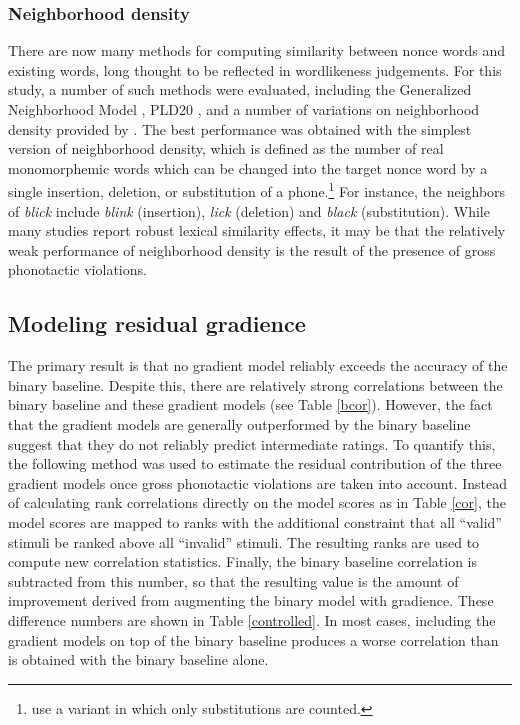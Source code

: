 \subsubsection{Neighborhood density} \label{density}

There are now many methods for computing similarity between nonce words and existing words, long thought to be reflected in wordlikeness judgements. 
For this study, a number of such methods were evaluated, including the Generalized Neighborhood Model \citep{Bailey2001}, PLD20 \citep{Suarez2011}, and a number of variations on neighborhood density \citep{Coltheart1977} provided by \citet{Vaden2009}. The best performance was obtained with the simplest version of neighborhood density, which is defined as the number of real monomorphemic words which can be changed into the target nonce word by a single insertion, deletion, or substitution of a phone.\footnote{\citet{Greenberg1964} use a variant in which only substitutions are counted.} For instance, the neighbors of \emph{blick} include \emph{blink} (insertion), \emph{lick} (deletion) and \emph{black} (substitution). While many studies \citep[e.g.,][]{Bailey2001} report robust lexical similarity effects, it may be that the relatively weak performance of neighborhood density is the result of the presence of gross phonotactic violations.

\subsection{Modeling residual gradience}

The primary result is that no gradient model reliably exceeds the accuracy of the binary baseline. Despite this, there are relatively strong correlations between the binary baseline and these gradient models (see Table \ref{bcor}). However, the fact that the gradient models are generally outperformed by the binary baseline suggest that they do not reliably predict intermediate ratings. To quantify this, the following method was used to estimate the residual contribution of the three gradient models once gross phonotactic violations are taken into account. Instead of calculating rank correlations directly on the model scores as in Table \ref{cor}, the model scores are mapped to ranks with the additional constraint that all ``valid'' stimuli be ranked above all ``invalid'' stimuli. The resulting ranks are used to compute new correlation statistics. Finally, the binary baseline correlation is subtracted from this number, so that the resulting value is the amount of improvement derived from augmenting the binary model with gradience. These difference numbers are shown in Table \ref{controlled}. In most cases, including the gradient models on top of the binary baseline produces a worse correlation than is obtained with the binary baseline alone.

